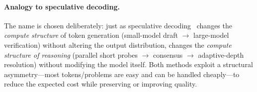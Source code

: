 \paragraph{Analogy to speculative decoding.}
The name \fullmethod{} is chosen deliberately: just as speculative
decoding~\citep{leviathan2023fast,chen2023accelerating} changes the
\emph{compute structure} of token generation (small-model draft $\to$
large-model verification) without altering the output distribution,
\method{} changes the \emph{compute structure of reasoning} (parallel
short probes $\to$ consensus $\to$ adaptive-depth resolution) without
modifying the model itself.
Both methods exploit a structural asymmetry---most tokens/problems are easy
and can be handled cheaply---to reduce the expected cost while preserving
or improving quality.

